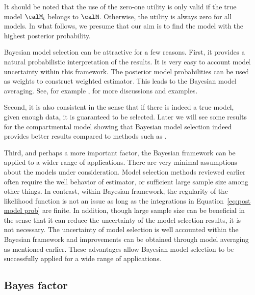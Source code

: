 It should be noted that the use of the zero-one utility is only valid if the
true model $\calM_t$ belongs to $\calM$. Otherwise, the utility is always zero
for all models. In what follows, we presume that our aim is to find the model
with the highest posterior probability.

Bayesian model selection can be attractive for a few reasons. First, it
provides a natural probabilistic interpretation of the results. It is very
easy to account model uncertainty within this framework. The posterior model
probabilities can be used as weights to construct weighted estimator. This
leads to the Bayesian model averaging. See, for example
\cite{Raftery:1997vx,Clyde:1999vx,Draper:1995vx}, for more discussions and
examples.

Second, it is also consistent in the sense that if there is indeed a true
model, given enough data, it is guaranteed to be selected. Later we will see
some results for the \pet compartmental model showing that Bayesian model
selection indeed provides better results compared to methods such as \aic.

Third, and perhaps a more important factor, the Bayesian framework can be
applied to a wider range of applications. There are very minimal assumptions
about the models under consideration. Model selection methods reviewed earlier
often require the well behavior of estimator, or sufficient large sample size
among other things. In contrast, within Bayesian framework, the regularity of
the likelihood function is not an issue as long as the integrations in
Equation~\eqref{eq:post model prob} are finite. In addition, though large
sample size can be beneficial in the sense that it can reduce the uncertainty
of the model selection results, it is not necessary. The uncertainty of model
selection is well accounted within the Bayesian framework and improvements can
be obtained through model averaging as mentioned earlier. These advantages
allow Bayesian model selection to be successfully applied for a wide range of
applications.

\subsection{Bayes factor}
\label{sub:Bayes factor}


